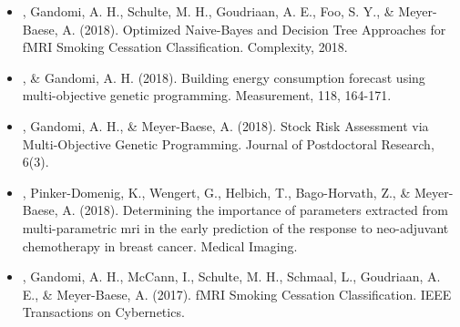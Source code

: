 \documentclass[]{template}
\begin{document}
\begin{itemize}
\item {}, Gandomi, A. H., Schulte, M. H., Goudriaan, A. E., Foo, S. Y., \& Meyer-Baese, A. (2018). Optimized Naive-Bayes and Decision Tree Approaches for fMRI Smoking Cessation Classification. Complexity, 2018.


\item {}, \& Gandomi, A. H. (2018). Building energy consumption forecast using multi-objective genetic programming. Measurement, 118, 164-171.


\item {}, Gandomi, A. H., \& Meyer-Baese, A. (2018). Stock Risk Assessment via Multi-Objective Genetic Programming. Journal of Postdoctoral Research, 6(3).


\item {}, Pinker-Domenig, K., Wengert, G., Helbich, T., Bago-Horvath, Z., \& Meyer-Baese, A. (2018). Determining the importance of parameters extracted from multi-parametric mri in the early prediction of the response to neo-adjuvant chemotherapy in breast cancer. Medical Imaging.

\item {}, Gandomi, A. H., McCann, I., Schulte, M. H., Schmaal, L., Goudriaan, A. E., \& Meyer-Baese, A. (2017). fMRI Smoking Cessation Classification. IEEE Transactions on Cybernetics.


\end{itemize}
\sectionsep 
\end{document}
